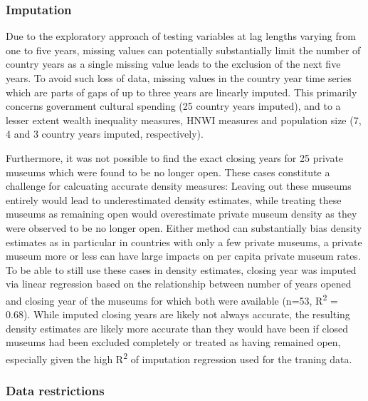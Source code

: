 \documentclass[11pt, authoryear]{elsarticle}
\begin{document}
\subsubsection{Imputation}


Due to the exploratory approach of testing variables at lag lengths varying from one to five years, missing values can potentially substantially limit the number of country years as a single missing value leads to the exclusion of the next five years.
To avoid such loss of data, missing values in the country year time series which are parts of gaps of up to three years are linearly imputed.
This primarily concerns government cultural spending (25 country years imputed), and to a lesser extent wealth inequality measures, HNWI measures and population size (7, 4 and 3 country years imputed, respectively).


Furthermore, it was not possible to find the exact closing years for 25 private museums which were found to be no longer open.
These cases constitute a challenge for calcuating accurate density measures: 
Leaving out these museums entirely would lead to underestimated density estimates, while treating these museums as remaining open would overestimate private museum density as they were observed to be no longer open. 
Either method can substantially bias density estimates as in particular in countries with only a few private museums, a private museum more or less can have large impacts on per capita private museum rates.
To be able to still use these cases in density estimates, closing year was imputed via linear regression based on the relationship between number of years opened and closing year of the museums for which both were available (n=53, R\textsuperscript{2} = 0.68).
While imputed closing years are likely not always accurate, the resulting density estimates are likely more accurate than they would have been if closed museums had been excluded completely or treated as having remained open, especially given the high R\textsuperscript{2} of imputation regression used for the traning data.


\subsubsection{Data restrictions}
\end{document}
